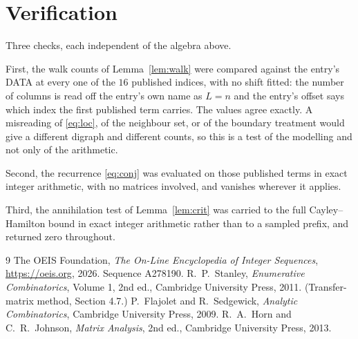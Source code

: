 \documentclass[11pt,a4paper]{article}
\theoremstyle{plain}
\theoremstyle{definition}
\begin{document}
\section{Verification}

Three checks, each independent of the algebra above.

First, the walk counts of Lemma~\ref{lem:walk} were compared against the entry's DATA at
every one of the $16$ published indices, with no shift fitted: the number of columns is
read off the entry's own name as $L=n$ and the entry's offset says which index the first
published term carries. The values agree exactly. A misreading of \eqref{eq:loc}, of the
neighbour set, or of the boundary treatment would give a different digraph and different
counts, so this is a test of the modelling and not only of the arithmetic.

Second, the recurrence \eqref{eq:conj} was evaluated on those published terms in exact
integer arithmetic, with no matrices involved, and vanishes wherever it applies.

Third, the annihilation test of Lemma~\ref{lem:crit} was carried to the full
Cayley--Hamilton bound in exact integer arithmetic rather than to a sampled prefix, and
returned zero throughout.

\begin{thebibliography}{9}
 The OEIS Foundation, \emph{The On-Line Encyclopedia of Integer
Sequences}, \url{https://oeis.org}, 2026. Sequence A278190.
 R.~P.~Stanley, \emph{Enumerative Combinatorics}, Volume 1, 2nd ed.,
Cambridge University Press, 2011. (Transfer-matrix method, Section 4.7.)
 P.~Flajolet and R.~Sedgewick, \emph{Analytic Combinatorics}, Cambridge
University Press, 2009.
 R.~A.~Horn and C.~R.~Johnson, \emph{Matrix Analysis}, 2nd ed., Cambridge
University Press, 2013.
\end{thebibliography}
\end{document}
